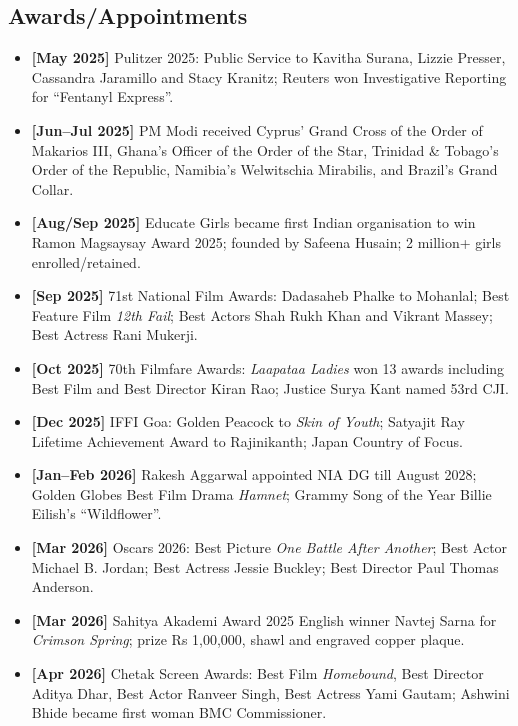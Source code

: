 \documentclass[10pt,a4paper]{article}
\newcommand{\monthtag}[1]{\textbf{[#1]}}
\newcommand{\fact}[2]{\item \monthtag{#1} #2}
\begin{document}
\subsection{Awards/Appointments}
\begin{itemize}
    \fact{May 2025}{Pulitzer 2025: Public Service to Kavitha Surana, Lizzie Presser, Cassandra Jaramillo and Stacy Kranitz; Reuters won Investigative Reporting for ``Fentanyl Express''.}
    \fact{Jun--Jul 2025}{PM Modi received Cyprus' Grand Cross of the Order of Makarios III, Ghana's Officer of the Order of the Star, Trinidad \& Tobago's Order of the Republic, Namibia's Welwitschia Mirabilis, and Brazil's Grand Collar.}
    \fact{Aug/Sep 2025}{Educate Girls became first Indian organisation to win Ramon Magsaysay Award 2025; founded by Safeena Husain; 2 million+ girls enrolled/retained.}
    \fact{Sep 2025}{71st National Film Awards: Dadasaheb Phalke to Mohanlal; Best Feature Film \textit{12th Fail}; Best Actors Shah Rukh Khan and Vikrant Massey; Best Actress Rani Mukerji.}
    \fact{Oct 2025}{70th Filmfare Awards: \textit{Laapataa Ladies} won 13 awards including Best Film and Best Director Kiran Rao; Justice Surya Kant named 53rd CJI.}
    \fact{Dec 2025}{IFFI Goa: Golden Peacock to \textit{Skin of Youth}; Satyajit Ray Lifetime Achievement Award to Rajinikanth; Japan Country of Focus.}
    \fact{Jan--Feb 2026}{Rakesh Aggarwal appointed NIA DG till August 2028; Golden Globes Best Film Drama \textit{Hamnet}; Grammy Song of the Year Billie Eilish's ``Wildflower''.}
    \fact{Mar 2026}{Oscars 2026: Best Picture \textit{One Battle After Another}; Best Actor Michael B. Jordan; Best Actress Jessie Buckley; Best Director Paul Thomas Anderson.}
    \fact{Mar 2026}{Sahitya Akademi Award 2025 English winner Navtej Sarna for \textit{Crimson Spring}; prize Rs 1,00,000, shawl and engraved copper plaque.}
    \fact{Apr 2026}{Chetak Screen Awards: Best Film \textit{Homebound}, Best Director Aditya Dhar, Best Actor Ranveer Singh, Best Actress Yami Gautam; Ashwini Bhide became first woman BMC Commissioner.}
\end{itemize}
\end{document}
